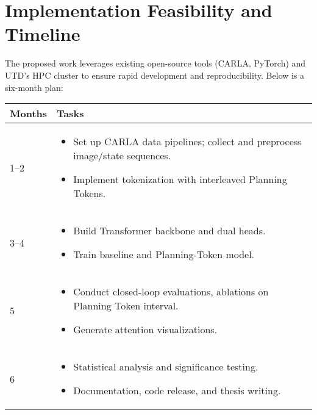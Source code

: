\documentclass[11pt,a4paper]{article}
\begin{document}
\section*{Implementation Feasibility and Timeline}

The proposed work leverages existing open-source tools (CARLA, PyTorch) and UTD's HPC cluster to ensure rapid development and reproducibility. Below is a six-month plan:

\begin{tabular}{p{3cm}p{10cm}}
    \toprule
    \textbf{Months} & \textbf{Tasks}                                                                  \\
    \midrule
    1--2            & \begin{itemize}[nosep]
                          \item Set up CARLA data pipelines; collect and preprocess image/state sequences.
                          \item Implement tokenization with interleaved Planning Tokens.
                      \end{itemize} \\

    3--4            & \begin{itemize}[nosep]
                          \item Build Transformer backbone and dual heads.
                          \item Train baseline and Planning-Token model.
                      \end{itemize}                                 \\

    5               & \begin{itemize}[nosep]
                          \item Conduct closed-loop evaluations, ablations on Planning Token interval.
                          \item Generate attention visualizations.
                      \end{itemize}     \\

    6               & \begin{itemize}[nosep]
                          \item Statistical analysis and significance testing.
                          \item Documentation, code release, and thesis writing.
                      \end{itemize}                           \\
    \bottomrule
\end{tabular}
\end{document}
